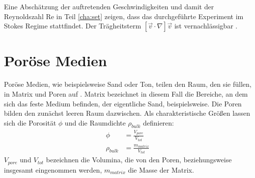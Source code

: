 Eine Abschätzung der auftretenden Geschwindigkeiten und damit der Reynoldszahl Re in Teil \ref{cha:set} zeigen, dass das durchgeführte Experiment im Stokes Regime stattfindet. Der Trägheitsterm $\left[ \vec{v} \cdot \nabla \right] \vec{v}$  ist vernachlässigbar \citep{roth2005}.






\section{Poröse Medien}
\label{sec:por}

Poröse Medien, wie beispielsweise Sand oder Ton, teilen den Raum, den sie füllen, in Matrix und Poren auf \citep{roth2005}.  Matrix bezeichnet in diesem Fall die Bereiche, an dem sich das feste Medium befinden, der eigentliche Sand, beispielsweise. Die Poren bilden den zunächst leeren Raum dazwischen.
Als charakteristische Größen lassen sich die Porosität $\phi$ und die Raumdichte $\rho_{bulk}$ definieren:
\begin{align}
 \phi &= \frac{V_{pore}}{V_{tot}} \\
 \rho_{bulk} &= \frac{m_{matrix}}{V_{tot}} %
\end{align}
$V_{pore}$ und $V_{tot}$ bezeichnen die Volumina, die von den Poren, beziehungsweise insgesamt eingenommen werden, $m_{matrix}$ die Masse der Matrix. 

